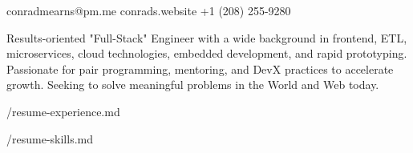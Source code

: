 \documentclass[9pt]{article}
\newcommand*{\lsname}[1]{\textls[150]{#1}}
\begin{document}
\begin{center}
\fontsize{16}{0}\selectfont
\lsname{Conrad Mearns}
\end{center}

\begin{center}
\fontsize{9}{9}\selectfont 
conradmearns@pm.me \space\space\space\space\space conrads.website \space\space\space\space\space +1 (208) 255-9280
\end{center}

\begin{center}
\begin{minipage}{0.86\textwidth} %
\begin{center}
\fontsize{8}{8}\selectfont
\begin{markdown}
Results-oriented "Full-Stack" Engineer with a wide background in frontend, ETL, microservices, cloud technologies, embedded development, and rapid prototyping. Passionate for pair programming, mentoring, and DevX practices to accelerate growth. Seeking to solve meaningful problems in the World and Web today.
\end{markdown}
\end{center}
\end{minipage}
\end{center}

\noindent
\hrulefill

\fontsize{6}{6}\selectfont


\noindent
\begin{minipage}[t]{0.56\linewidth}
\vspace{10pt}
\begin{markdown}
/resume-experience.md
\end{markdown}
\end{minipage}%
% 
\begin{minipage}[t]{0.015\linewidth} %
\hfill
\end{minipage}%
% 
\hfill\vline\hfill
% 
\begin{minipage}[t]{0.01\linewidth} %
\hfill
\end{minipage}%
% 
\begin{minipage}[t]{0.4\linewidth}
\vspace{10pt}
\begin{markdown}
/resume-skills.md
\end{markdown}
\end{minipage}


\vspace*{\fill}
\hspace*{\fill}
\color{gray!30}
\ifdefined\resumeBuild
  \resumeBuild
\fi
\end{document}

